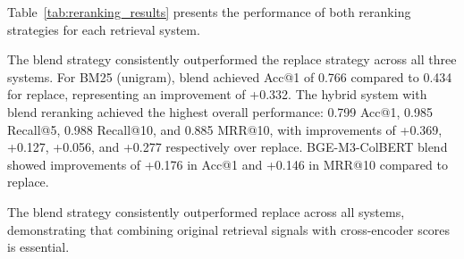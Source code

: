 \documentclass[preprint,12pt]{elsarticle}
\begin{document}
Table~\ref{tab:reranking_results} presents the performance of both reranking strategies for each retrieval system.
\begin{table}[ht]
\centering
\caption{Performance comparison of cross-encoder reranking strategies. Replace uses CE scores only; Blend combines original retrieval scores with CE scores ($\lambda=0.6$).}
\label{tab:reranking_results}
\end{table}
The blend strategy consistently outperformed the replace strategy across all three systems. For BM25 (unigram), blend achieved Acc@1 of 0.766 compared to 0.434 for replace, representing an improvement of +0.332. The hybrid system with blend reranking achieved the highest overall performance: 0.799 Acc@1, 0.985 Recall@5, 0.988 Recall@10, and 0.885 MRR@10, with improvements of +0.369, +0.127, +0.056, and +0.277 respectively over replace. BGE-M3-ColBERT blend showed improvements of +0.176 in Acc@1 and +0.146 in MRR@10 compared to replace.

The blend strategy consistently outperformed replace across all systems, demonstrating that combining original retrieval signals with cross-encoder scores is essential.
\end{document}
